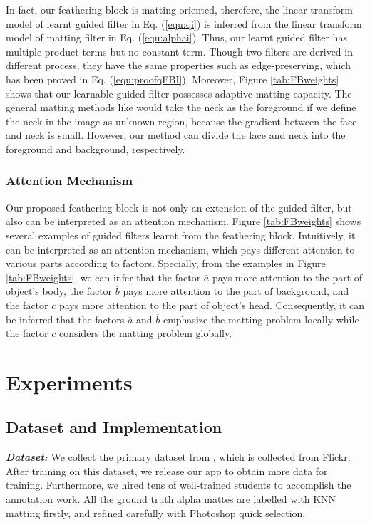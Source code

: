 \documentclass[sigconf]{acmart}
\begin{document}
In fact, our feathering block is matting oriented, therefore, the linear transform model of learnt guided filter in Eq. (\ref{equ:qi}) is inferred from the linear transform model of matting filter in Eq. (\ref{equ:alphai}). Thus, our learnt guided filter has multiple product terms but no constant term. Though two filters are derived in different process, they have the same properties such as edge-preserving, which has been proved in Eq. (\ref{equ:proofqFBI}).
Moreover, Figure \ref{tab:FBweights} shows that our learnable guided filter possesses adaptive matting capacity. The general matting methods like \cite{levin2008closed, gastal2010shared} would take the neck as the foreground if we define the neck in the image as unknown region, because the gradient between the face and neck is small. However, our method can divide the face and neck into the foreground and background, respectively.
\subsubsection{Attention Mechanism}
Our proposed feathering block is not only an extension of the guided filter, but also can be interpreted as an attention mechanism. Figure \ref{tab:FBweights} shows several examples of guided filters learnt from the feathering block. Intuitively, it can be interpreted as an attention mechanism, which pays different attention to various parts according to factors. Specially, from the examples in Figure \ref{tab:FBweights}, we can infer that the factor $\overline a $ pays more attention to the part of object's body, the factor $\overline b $ pays more attention to the part of background, and the factor $\overline c $ pays more attention to the part of object's head. Consequently, it can be inferred that the factors $\overline a $ and $\overline b $ emphasize the matting problem locally while the factor $\overline c $ considers the matting problem globally.

\section{Experiments}\subsection{Dataset and Implementation}\textbf{\emph{Dataset:}} We collect the primary dataset from \cite{shen2016deep}, which is collected from Flickr. After training on this dataset, we release our app to obtain more data for training. Furthermore, we hired tens of well-trained students to accomplish the annotation work. All the ground truth alpha mattes are labelled with KNN matting \cite{chen2013knn} firstly, and refined carefully with Photoshop quick selection.
\end{document}
